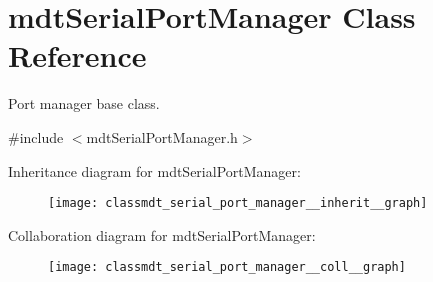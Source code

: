 \hypertarget{classmdt_serial_port_manager}{
\section{mdtSerialPortManager Class Reference}
\label{classmdt_serial_port_manager}
}


Port manager base class.  




{\ttfamily \#include $<$mdtSerialPortManager.h$>$}



Inheritance diagram for mdtSerialPortManager:\nopagebreak
\begin{figure}[H]
\begin{center}
\leavevmode
\texttt{[image: classmdt\_serial\_port\_manager\_\_inherit\_\_graph]}
\end{center}
\end{figure}


Collaboration diagram for mdtSerialPortManager:\nopagebreak
\begin{figure}[H]
\begin{center}
\leavevmode
\texttt{[image: classmdt\_serial\_port\_manager\_\_coll\_\_graph]}
\end{center}
\end{figure}
